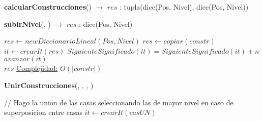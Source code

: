 \begin{Algoritmos}
\begin{algorithm}[H]{\textbf{calcularConstrucciones}() $\to$ $res$ : tupla(dicc(Pos, Nivel), dicc(Pos, Nivel))}
\begin{algorithmic}[1]
	\Statex \tab{}
	\Statex \tab{}

\end{algorithmic}
\end{algorithm}

\begin{algorithm}[H]{\textbf{subirNivel}(, ) $\to$ $res$ : dicc(Pos, Nivel)} %
\begin{algorithmic}[1]
    \State $res \gets new DiccionarioLineal(Pos, Nivel)$ 
    \State $res \gets copiar(constr)$ 
    \State $it \gets crearIt(res)$  
     
        \State $SiguienteSignificado(it) = SiguienteSignificado(it) + n$ 
        \State $avanzar(it)$ 
    \EndWhile\\
    \Return $res$ 
    \medskip
    \Statex \underline{Complejidad:} $O(|constr|)$
\end{algorithmic}
\end{algorithm}

\begin{algorithm}[H]{\textbf{UnirConstrucciones}(, , , )} %
\begin{algorithmic}[1]
    \State // Hago la union de las casas seleccionando las de mayor nivel en caso de superposicion entre casas
    \State $it \gets crearIt(casUN)$ 
     
    
    
        

\end{algorithmic}
\end{algorithm}
\end{Algoritmos}
